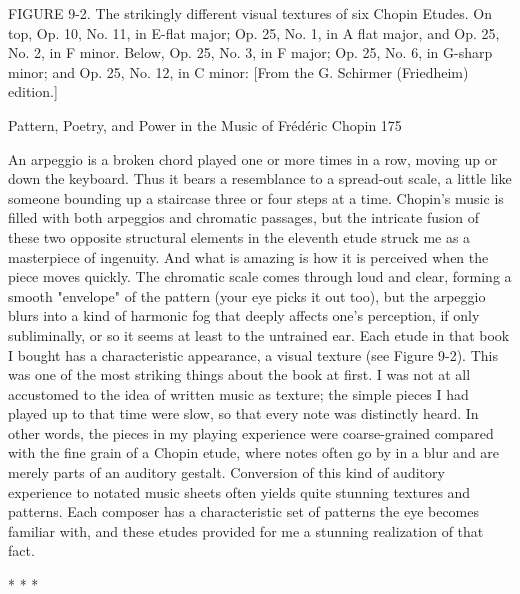FIGURE 9-2. The strikingly different visual textures of six Chopin Etudes. On top, Op.
10, No. 11, in E-flat major; Op. 25, No. 1, in A flat major, and Op. 25, No. 2, in F minor.
Below, Op. 25, No. 3, in F major; Op. 25, No. 6, in G-sharp minor; and Op. 25, No. 12,
in C minor: [From the G. Schirmer (Friedheim) edition.]




Pattern, Poetry, and Power in the Music of Frédéric Chopin                             175

An arpeggio is a broken chord played one or more times in a row, moving up or down the
keyboard. Thus it bears a resemblance to a spread-out scale, a little like someone
bounding up a staircase three or four steps at a time. Chopin's music is filled with both
arpeggios and chromatic passages, but the intricate fusion of these two opposite structural
elements in the eleventh etude struck me as a masterpiece of ingenuity. And what is
amazing is how it is perceived when the piece moves quickly. The chromatic scale comes
through loud and clear, forming a smooth "envelope" of the pattern (your eye picks it out
too), but the arpeggio blurs into a kind of harmonic fog that deeply affects one's
perception, if only subliminally, or so it seems at least to the untrained ear.
        Each etude in that book I bought has a characteristic appearance, a visual texture
(see Figure 9-2). This was one of the most striking things about the book at first. I was
not at all accustomed to the idea of written music as texture; the simple pieces I had
played up to that time were slow, so that every note was distinctly heard. In other words,
the pieces in my playing experience were coarse-grained compared with the fine grain of
a Chopin etude, where notes often go by in a blur and are merely parts of an auditory
gestalt. Conversion of this kind of auditory experience to notated music sheets often
yields quite stunning textures and patterns. Each composer has a characteristic set of
patterns the eye becomes familiar with, and these etudes provided for me a stunning
realization of that fact.

                                            *     *     *

